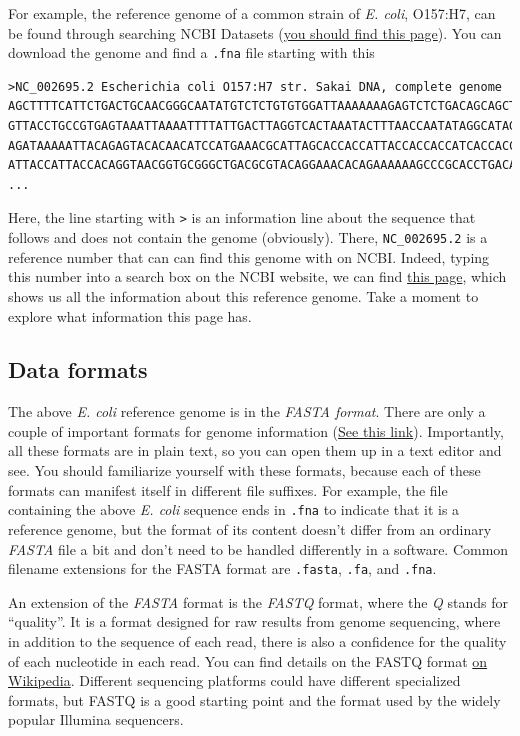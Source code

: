 \documentclass[12pt,letterpaper]{article}
\begin{document}
For example, the reference genome of a common strain of \textit{E. coli}, O157:H7, can be found through searching NCBI Datasets (\href{https://www.ncbi.nlm.nih.gov/datasets/taxonomy/83334/}{you should find this page}). You can download the genome and find a \texttt{.fna} file starting with this

\begin{verbatim}
>NC_002695.2 Escherichia coli O157:H7 str. Sakai DNA, complete genome
AGCTTTTCATTCTGACTGCAACGGGCAATATGTCTCTGTGTGGATTAAAAAAAGAGTCTCTGACAGCAGCTTCTGAACTG
GTTACCTGCCGTGAGTAAATTAAAATTTTATTGACTTAGGTCACTAAATACTTTAACCAATATAGGCATAGCGCACAGAC
AGATAAAAATTACAGAGTACACAACATCCATGAAACGCATTAGCACCACCATTACCACCACCATCACCACCACCATCACC
ATTACCATTACCACAGGTAACGGTGCGGGCTGACGCGTACAGGAAACACAGAAAAAAGCCCGCACCTGACAGTGCGGGCT
...
\end{verbatim}

Here, the line starting with \texttt{>} is an information line about the sequence that follows and does not contain the genome (obviously). There, \texttt{NC\_002695.2} is a reference number that can can find this genome with on NCBI. Indeed, typing this number into a search box on the NCBI website, we can find \href{https://www.ncbi.nlm.nih.gov/nuccore/NC_002695.2/}{this page}, which shows us all the information about this reference genome. Take a moment to explore what information this page has.

\subsection{Data formats}

The above \textit{E. coli} reference genome is in the \textit{FASTA format}. There are only a couple of important formats for genome information (\href{https://www.animalgenome.org/bioinfo/resources/manuals/seqformats}{See this link}). Importantly, all these formats are in plain text, so you can open them up in a text editor and see. You should familiarize yourself with these formats, because each of these formats can manifest itself in different file suffixes. For example, the file containing the above \textit{E. coli} sequence ends in \texttt{.fna} to indicate that it is a reference genome, but the format of its content doesn't differ from an ordinary \textit{FASTA} file a bit and don't need to be handled differently in a software. Common filename extensions for the FASTA format are \texttt{.fasta}, \texttt{.fa}, and \texttt{.fna}.

An extension of the \textit{FASTA} format is the \textit{FASTQ} format, where the \textit{Q} stands for ``quality''. It is a format designed for raw results from genome sequencing, where in addition to the sequence of each read, there is also a confidence for the quality of each nucleotide in each read. You can find details on the FASTQ format \href{https://en.wikipedia.org/wiki/FASTQ_format}{on Wikipedia}. Different sequencing platforms could have different specialized formats, but FASTQ is a good starting point and the format used by the widely popular Illumina sequencers.
\end{document}
